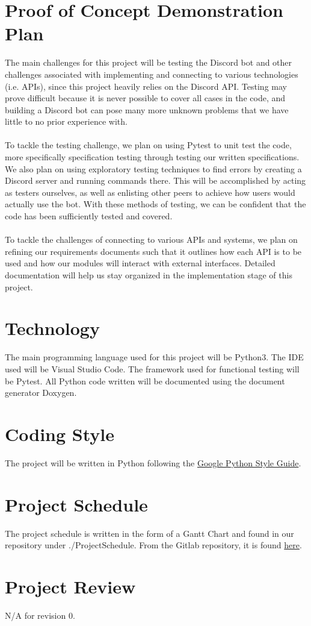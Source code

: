 \documentclass{article}
\begin{document}
\section{Proof of Concept Demonstration Plan}
The main challenges for this project will be testing the Discord bot and other challenges associated with implementing and connecting to various technologies (i.e. APIs), since this project heavily relies on the Discord API. Testing may prove difficult because it is never possible to cover all cases in the code, and building a Discord bot can pose many more unknown problems that we have little to no prior experience with.\\ \\
To tackle the testing challenge, we plan on using Pytest to unit test the code, more specifically specification testing through testing our written specifications. We also plan on using exploratory testing techniques to find errors by creating a Discord server and running commands there. This will be accomplished by acting as testers ourselves, as well as enlisting other peers to achieve how users would actually use the bot. With these methods of testing, we can be confident that the code has been sufficiently tested and covered.\\ \\
To tackle the challenges of connecting to various APIs and systems, we plan on refining our requirements documents such that it outlines how each API is to be used and how our modules will interact with external interfaces. Detailed documentation will help us stay organized in the implementation stage of this project.


\section{Technology}
The main programming language used for this project will be Python3. The IDE used will be Visual Studio Code. The framework used for functional testing will be Pytest. All Python code written will be documented using the document generator Doxygen.

\section{Coding Style}
The project will be written in Python following the \href{https://google.github.io/styleguide/pyguide.html}{Google Python Style Guide}.

\section{Project Schedule}
The project schedule is written in the form of a Gantt Chart and found in our repository under ./ProjectSchedule. From the Gitlab repository, it is found \href{https://gitlab.cas.mcmaster.ca/modia1/ScrumBot/tree/master/ProjectSchedule}{here}.

\section{Project Review}
N/A for revision 0.
\end{document}
